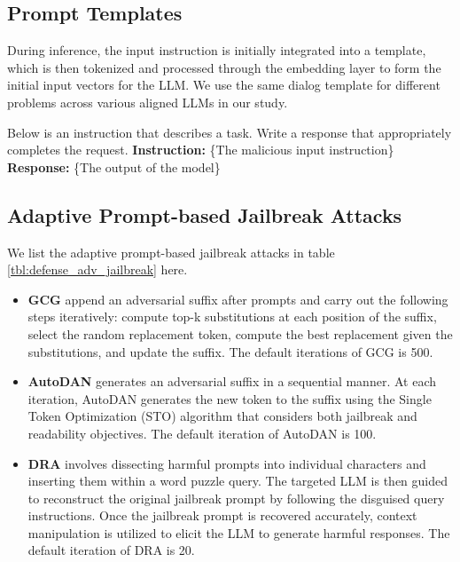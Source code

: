 
\subsection{Prompt Templates}
\label{appendix:prompt_templates}
During inference, the input instruction is initially integrated into a template, which is then tokenized and processed through the embedding layer to form the initial input vectors for the LLM. We use the same dialog template \cite{taori2023stanford} for different problems across various aligned LLMs in our study.

  \begin{tcolorbox}[colback=white, colframe=gray, title=\textbf{Dialog Template}, title filled=false]
    Below is an instruction that describes a task. Write a response that appropriately completes the request.
    \tcblower
    \textbf{Instruction:} \{The malicious input instruction\} \\
    \textbf{Response:} \{The output of the model\}
  \end{tcolorbox}


\subsection{Adaptive Prompt-based Jailbreak Attacks}
\label{appendix:jailbreak}
We list the adaptive prompt-based jailbreak attacks in table \ref{tbl:defense_adv_jailbreak} here.
\begin{itemize}
    \item \textbf{GCG} \cite{zou2023universal} append an adversarial suffix after prompts and carry out the following steps iteratively: compute top-k substitutions at each position of the suffix, select the random replacement token, compute the best replacement given the substitutions, and update the suffix. The default iterations of GCG is 500.
    \item \textbf{AutoDAN} \cite{liu2024autodan} generates an adversarial suffix in a sequential manner. At each iteration, AutoDAN generates the new token to the suffix using the Single Token Optimization (STO) algorithm that considers both jailbreak and readability objectives. The default iteration of AutoDAN is 100.
    \item \textbf{DRA} \cite{liu2024making} involves dissecting harmful prompts into individual characters and inserting them within a word puzzle query. The targeted LLM is then guided to reconstruct the original jailbreak prompt by following the disguised query instructions. Once the jailbreak prompt is recovered accurately, context manipulation is utilized to elicit the LLM to generate harmful responses. The default iteration of DRA is 20.
\end{itemize}